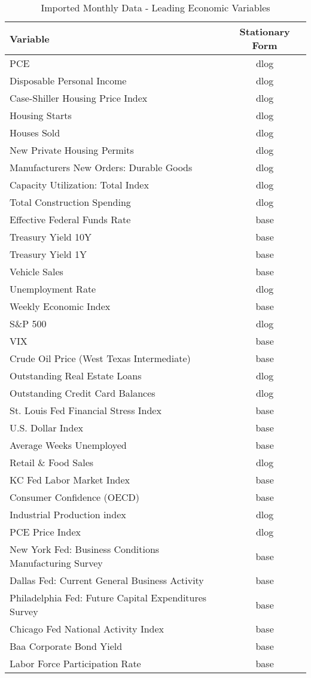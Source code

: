 \documentclass[11pt, letterpaper]{article}\usepackage[]{graphicx}\usepackage[]{color}
\begin{document}
\begin{table}[H]
\centering
\begingroup\scriptsize
\begin{tabular}{lc}
  \hline
Variable & Stationary Form \\ 
  \hline
PCE & dlog \\ 
  Disposable Personal Income & dlog \\ 
  Case-Shiller Housing Price Index & dlog \\ 
  Housing Starts & dlog \\ 
  Houses Sold & dlog \\ 
  New Private Housing Permits & dlog \\ 
  Manufacturers New Orders: Durable Goods & dlog \\ 
  Capacity Utilization: Total Index & dlog \\ 
  Total Construction Spending & dlog \\ 
  Effective Federal Funds Rate & base \\ 
  Treasury Yield 10Y & base \\ 
  Treasury Yield 1Y & base \\ 
  Vehicle Sales & base \\ 
  Unemployment Rate & dlog \\ 
  Weekly Economic Index & base \\ 
  S\&P 500 & dlog \\ 
  VIX & base \\ 
  Crude Oil Price (West Texas Intermediate) & base \\ 
  Outstanding Real Estate Loans & dlog \\ 
  Outstanding Credit Card Balances & dlog \\ 
  St. Louis Fed Financial Stress Index & base \\ 
  U.S. Dollar Index & base \\ 
  Average Weeks Unemployed & base \\ 
  Retail \& Food Sales & dlog \\ 
  KC Fed Labor Market Index & base \\ 
  Consumer Confidence (OECD) & base \\ 
  Industrial Production index & dlog \\ 
  PCE Price Index & dlog \\ 
  New York Fed: Business Conditions Manufacturing Survey & base \\ 
  Dallas Fed: Current General Business Activity & base \\ 
  Philadelphia Fed: Future Capital Expenditures Survey & base \\ 
  Chicago Fed National Activity Index & base \\ 
  Baa Corporate Bond Yield & base \\ 
  Labor Force Participation Rate & base \\ 
   \hline
\end{tabular}
\endgroup
\caption{Imported Monthly Data - Leading Economic Variables} 
\end{table}
\end{document}
